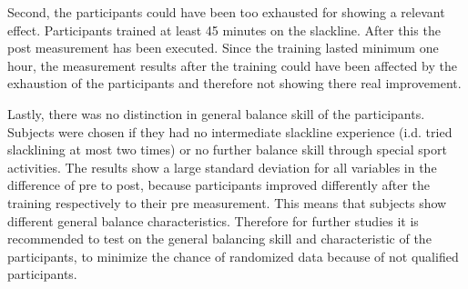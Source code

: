 Second, the participants could have been too exhausted for showing a relevant effect.
Participants trained at least 45 minutes on the slackline.
After this the post measurement has been executed.
Since the training lasted minimum one hour, the measurement results after the training could have been affected by the exhaustion of the participants and therefore not showing there real improvement.



Lastly, there was no distinction in general balance skill of the participants.
Subjects were chosen if they had no intermediate slackline experience (i.d. tried slacklining at most two times) or no further balance skill through special sport activities.
The results show a large standard deviation for all variables in the difference of pre to post, because participants improved differently after the training respectively to their pre measurement.
This means that subjects show different general balance characteristics.
Therefore for further studies it is recommended to test on the general balancing skill and characteristic of the participants, to minimize the chance of randomized data because of not qualified participants.


